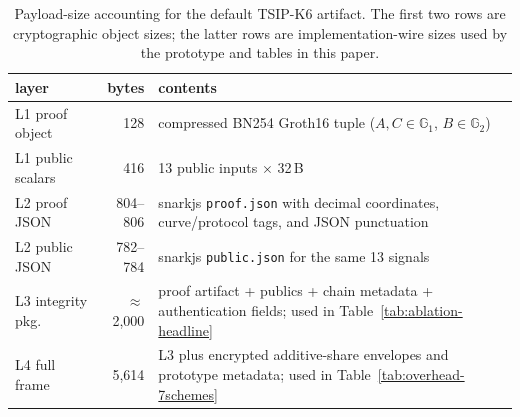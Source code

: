 \begin{table}[t]
\centering
\caption{Payload-size accounting for the default \textsc{TSIP-K6} artifact.
The first two rows are cryptographic object sizes; the latter rows are
implementation-wire sizes used by the prototype and tables in this paper.}
\label{tab:payload-breakdown}
\scriptsize
\setlength{\tabcolsep}{3pt}
\begin{tabularx}{\columnwidth}{@{}l r Y@{}}
\toprule
layer & bytes & contents \\
\midrule
L1 proof object & 128 & compressed BN254 Groth16 tuple
($A,C\in\mathbb{G}_1$, $B\in\mathbb{G}_2$) \\
L1 public scalars & 416 & 13 public inputs $\times$ 32\,B \\
L2 proof JSON & 804--806 & snarkjs \texttt{proof.json} with decimal coordinates,
curve/protocol tags, and JSON punctuation \\
L2 public JSON & 782--784 & snarkjs \texttt{public.json} for the same 13 signals \\
L3 integrity pkg. & $\approx$2{,}000 & proof artifact + publics + chain
metadata + authentication fields; used in Table~\ref{tab:ablation-headline} \\
L4 full frame & 5{,}614 & L3 plus encrypted additive-share envelopes and
prototype metadata; used in Table~\ref{tab:overhead-7schemes} \\
\bottomrule
\end{tabularx}
\end{table}
